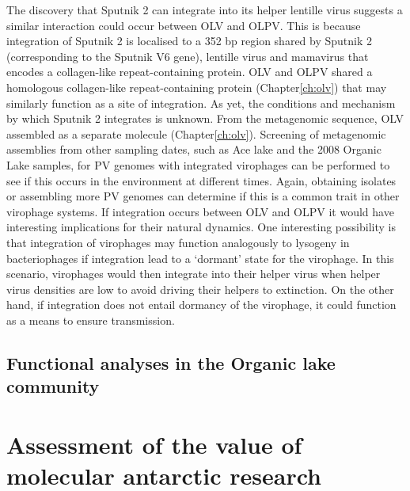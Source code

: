 The discovery that Sputnik 2 can integrate into its helper lentille virus suggests a similar interaction could occur between \ac{OLV} and \ac{OLPV}.
This is because integration of Sputnik 2 is localised to a 352 bp region shared by Sputnik 2 (corresponding to the Sputnik V6 gene), lentille virus and mamavirus  \cite{Desnues2012} that encodes a collagen-like repeat-containing protein.
\ac{OLV} and \ac{OLPV} shared a homologous collagen-like repeat-containing protein (Chapter\ref{ch:olv}) that may similarly function as a site of integration.
As yet, the conditions and mechanism by which Sputnik 2 integrates is unknown.
From the metagenomic sequence, \ac{OLV} assembled as a separate molecule (Chapter\ref{ch:olv}).
Screening of metagenomic assemblies from other sampling dates, such as Ace lake and the 2008 Organic Lake samples, for \ac{PV} genomes with integrated virophages can be performed to see if this occurs in the environment at different times.
Again, obtaining isolates or assembling more \ac{PV} genomes can determine if this is a common trait in other virophage systems.
If integration occurs between \ac{OLV} and \ac{OLPV} it would have interesting implications for their natural dynamics.
One interesting possibility is that integration of virophages may function analogously to lysogeny in bacteriophages if integration lead to a `dormant' state for the virophage.
In this scenario, virophages would then integrate into their helper virus when helper virus densities are low to avoid driving their helpers to extinction.
On the other hand, if integration does not entail dormancy of the virophage, it could function as a means to ensure transmission.



\subsection{Functional analyses in the Organic lake community}


\section{Assessment of the value of molecular antarctic research}

